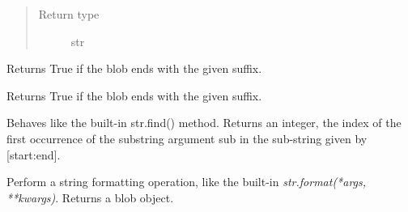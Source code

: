\documentclass[letterpaper,10pt,english]{sphinxmanual}
\begin{document}
\begin{fulllineitems}
\begin{fulllineitems}
\begin{description}
\end{description}

\begin{quote}\begin{description}
\item[{Return type}] \leavevmode
str

\end{description}\end{quote}

\end{fulllineitems}


\begin{fulllineitems}
\label{api_reference:textblob_de.blob.BaseBlob.ends_with}
Returns True if the blob ends with the given suffix.

\end{fulllineitems}


\begin{fulllineitems}
\label{api_reference:textblob_de.blob.BaseBlob.endswith}
Returns True if the blob ends with the given suffix.

\end{fulllineitems}


\begin{fulllineitems}
\label{api_reference:textblob_de.blob.BaseBlob.find}
Behaves like the built-in str.find() method. Returns an integer,
the index of the first occurrence of the substring argument sub in the
sub-string given by {[}start:end{]}.

\end{fulllineitems}


\begin{fulllineitems}
\label{api_reference:textblob_de.blob.BaseBlob.format}
Perform a string formatting operation, like the built-in
\emph{str.format(*args, **kwargs)}. Returns a blob object.


\end{fulllineitems}
\end{fulllineitems}
\end{document}
